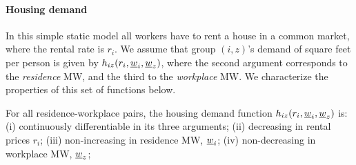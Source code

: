 \paragraph{Housing demand}

In this simple static model all workers have to rent a house in a common market, 
where the rental rate is $r_i$.
We assume that group $(i,z)$'s demand of square feet per person is given by $h_{iz}
(r_i, \underline{w}_i, \underline{w}_z)$, where the second argument corresponds to the \textit{residence} 
MW, and the third to the \textit{workplace} MW.
We characterize the properties of this set of functions below.

\begin{assu}\label{assu:housing_function}
	For all residence-workplace pairs, the housing demand function $h_{iz} (r_i, 	
	\underline{w}_i, \underline{w}_z)$ is:
	(i) continuously differentiable in its three arguments;
	(ii) decreasing in rental prices $r_i$;
	(iii) non-increasing in residence MW, $\underline{w}_i$;
	(iv) non-decreasing in workplace MW, $\underline{w}_z$;
\end{assu}

